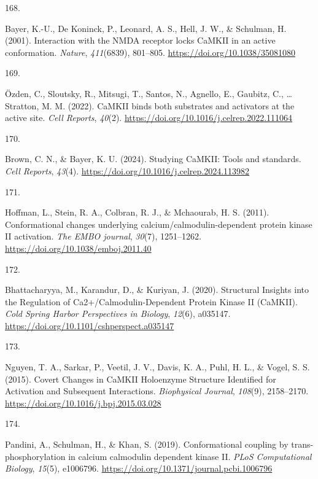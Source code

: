 \documentclass[
  11pt,
  letterpaper,
]{scrreprt}
\newlength{\cslhangindent}
\newlength{\csllabelwidth}
\newenvironment{CSLReferences}[2] %
 {\begin{list}{}{%
  \setlength{\itemindent}{0pt}
  \setlength{\leftmargin}{0pt}
  \setlength{\parsep}{0pt}
  \ifodd #1
   \setlength{\leftmargin}{\cslhangindent}
   \setlength{\itemindent}{-1\cslhangindent}
  \fi
  \setlength{\itemsep}{#2\baselineskip}}}
 {\end{list}}
\newcommand{\CSLLeftMargin}[1]{\parbox[t]{\csllabelwidth}{\strut#1\strut}}
\newcommand{\CSLRightInline}[1]{\parbox[t]{\linewidth - \csllabelwidth}{\strut#1\strut}}
\begin{document}
\begin{CSLReferences}{0}{0}
\CSLLeftMargin{168. }%
\CSLRightInline{Bayer, K.-U., De Koninck, P., Leonard, A. S., Hell, J.
W., \& Schulman, H. (2001). Interaction with the {NMDA} receptor locks
{CaMKII} in an active conformation. \emph{Nature}, \emph{411}(6839),
801--805. \url{https://doi.org/10.1038/35081080}}

\CSLLeftMargin{169. }%
\CSLRightInline{Özden, C., Sloutsky, R., Mitsugi, T., Santos, N.,
Agnello, E., Gaubitz, C., \ldots{} Stratton, M. M. (2022). {CaMKII}
binds both substrates and activators at the active site. \emph{Cell
Reports}, \emph{40}(2).
\url{https://doi.org/10.1016/j.celrep.2022.111064}}

\CSLLeftMargin{170. }%
\CSLRightInline{Brown, C. N., \& Bayer, K. U. (2024). Studying {CaMKII}:
{Tools} and standards. \emph{Cell Reports}, \emph{43}(4).
\url{https://doi.org/10.1016/j.celrep.2024.113982}}

\CSLLeftMargin{171. }%
\CSLRightInline{Hoffman, L., Stein, R. A., Colbran, R. J., \& Mchaourab,
H. S. (2011). Conformational changes underlying
calcium/calmodulin-dependent protein kinase {II} activation. \emph{The
EMBO journal}, \emph{30}(7), 1251--1262.
\url{https://doi.org/10.1038/emboj.2011.40}}

\CSLLeftMargin{172. }%
\CSLRightInline{Bhattacharyya, M., Karandur, D., \& Kuriyan, J. (2020).
Structural {Insights} into the {Regulation} of
{Ca2}+/{Calmodulin-Dependent Protein Kinase II} ({CaMKII}). \emph{Cold
Spring Harbor Perspectives in Biology}, \emph{12}(6), a035147.
\url{https://doi.org/10.1101/cshperspect.a035147}}

\CSLLeftMargin{173. }%
\CSLRightInline{Nguyen, T. A., Sarkar, P., Veetil, J. V., Davis, K. A.,
Puhl, H. L., \& Vogel, S. S. (2015). Covert {Changes} in {CaMKII
Holoenzyme Structure Identified} for {Activation} and {Subsequent
Interactions}. \emph{Biophysical Journal}, \emph{108}(9), 2158--2170.
\url{https://doi.org/10.1016/j.bpj.2015.03.028}}

\CSLLeftMargin{174. }%
\CSLRightInline{Pandini, A., Schulman, H., \& Khan, S. (2019).
Conformational coupling by trans-phosphorylation in calcium calmodulin
dependent kinase {II}. \emph{PLoS Computational Biology}, \emph{15}(5),
e1006796. \url{https://doi.org/10.1371/journal.pcbi.1006796}}


\end{CSLReferences}
\end{document}
